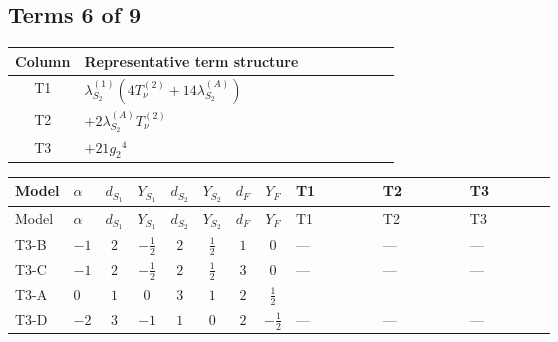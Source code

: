 \documentclass[8pt]{article}
\begin{document}
\begin{landscape}
\subsection*{Terms 6 of 9}
\begin{center}
\begin{tabular}{@{}c >{\raggedright\arraybackslash}p{0.82\linewidth}@{}}
\toprule
Column & Representative term structure \\
\midrule
T1 & \(\displaystyle {\lambda_{S_2}^{(1)}} (4 T_{\nu}^{(2)}+14 {\lambda_{S_2}^{(A)}})\) \\
\midrule
T2 & \(\displaystyle +2 {\lambda_{S_2}^{(A)}} T_{\nu}^{(2)}\) \\
\midrule
T3 & \(\displaystyle +21 {g_2}^4\) \\
\midrule
\bottomrule
\end{tabular}
\end{center}
\smallskip
\tiny
\begin{longtable}{@{}llcccccc >{\raggedright\arraybackslash}p{0.21\linewidth} >{\raggedright\arraybackslash}p{0.21\linewidth} >{\raggedright\arraybackslash}p{0.21\linewidth}@{}}
\toprule
Model & $\alpha$ & $d_{S_1}$ & $Y_{S_1}$ & $d_{S_2}$ & $Y_{S_2}$ & $d_F$ & $Y_F$ & T1 & T2 & T3 \\
\midrule
\endfirsthead
\toprule
Model & $\alpha$ & $d_{S_1}$ & $Y_{S_1}$ & $d_{S_2}$ & $Y_{S_2}$ & $d_F$ & $Y_F$ & T1 & T2 & T3 \\
\midrule
\endhead
T3-B & $-1$ & $2$ & $-\frac{1}{2}$ & $2$ & $\frac{1}{2}$ & $1$ & $0$ & --- & --- & --- \\
\midrule
T3-C & $-1$ & $2$ & $-\frac{1}{2}$ & $2$ & $\frac{1}{2}$ & $3$ & $0$ & --- & --- & --- \\
\midrule
T3-A & $0$ & $1$ & $0$ & $3$ & $1$ & $2$ & $\frac{1}{2}$ & \scriptsize\adjustbox{max width=\linewidth}{$\begin{gathered} {\lambda_{S_2}^{(1)}} (4 T_{\nu}^{(2)}+14 {\lambda_{S_2}^{(A)}})\end{gathered}$} & \scriptsize\adjustbox{max width=\linewidth}{$\begin{gathered} +2 {\lambda_{S_2}^{(A)}} T_{\nu}^{(2)}\end{gathered}$} & \scriptsize\adjustbox{max width=\linewidth}{$\begin{gathered} +21 {g_2}^4\end{gathered}$} \\
\midrule
T3-D & $-2$ & $3$ & $-1$ & $1$ & $0$ & $2$ & $-\frac{1}{2}$ & --- & --- & --- \\
\midrule

\end{longtable}
\end{landscape}
\end{document}
